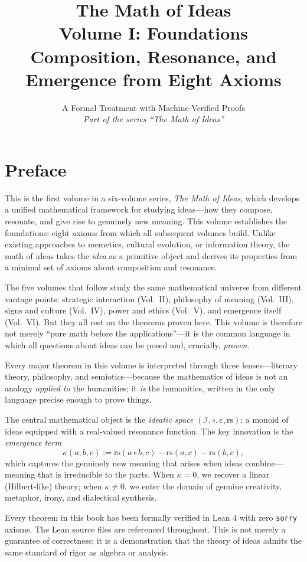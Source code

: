 \documentclass[11pt,oneside]{book}
\title{\Huge\bfseries The Math of Ideas\\[0.3em]
\LARGE Volume I: Foundations\\[0.5em]
\Large Composition, Resonance, and Emergence from Eight Axioms}
\author{A Formal Treatment with Machine-Verified Proofs\\[0.3em]
\normalsize\textit{Part of the series ``The Math of Ideas''}}
\date{}
\theoremstyle{plain}
\theoremstyle{definition}
\theoremstyle{remark}
\newcommand{\rs}{\mathrm{rs}}
\newcommand{\emerge}{\kappa}
\newcommand{\compose}{\circ}
\newcommand{\void}{\varepsilon}
\newcommand{\IS}{\mathcal{I}}
\begin{document}
\maketitle

\frontmatter

\chapter*{Preface}

This is the first volume in a six-volume series, \emph{The Math of Ideas}, which 
develops a unified mathematical framework for studying ideas---how they compose, 
resonate, and give rise to genuinely new meaning. This volume establishes the 
foundations: eight axioms from which all subsequent volumes build. Unlike existing 
approaches to memetics, cultural evolution, or information theory, the math of 
ideas takes the \emph{idea} as a primitive object and derives its properties from 
a minimal set of axioms about composition and resonance.

The five volumes that follow study the same mathematical universe from different 
vantage points: strategic interaction (Vol.~II), philosophy of meaning (Vol.~III), 
signs and culture (Vol.~IV), power and ethics (Vol.~V), and emergence itself 
(Vol.~VI). But they all rest on the theorems proven here. This volume is therefore 
not merely ``pure math before the applications''---it is the common language in 
which all questions about ideas can be posed and, crucially, \emph{proven}.

Every major theorem in this volume is interpreted through three lenses---literary 
theory, philosophy, and semiotics---because the mathematics of ideas is not an 
analogy \emph{applied to} the humanities; it \emph{is} the humanities, written in 
the only language precise enough to prove things.

The central mathematical object is the \emph{ideatic space} $(\IS, \compose, \void, \rs)$:
a monoid of ideas equipped with a real-valued resonance function. The key innovation
is the \emph{emergence term}
\[
\emerge(a,b,c) := \rs(a \compose b, c) - \rs(a,c) - \rs(b,c),
\]
which captures the genuinely new meaning that arises when ideas combine---meaning
that is irreducible to the parts. When $\emerge = 0$, we recover a linear (Hilbert-like)
theory; when $\emerge \neq 0$, we enter the domain of genuine creativity, metaphor,
irony, and dialectical synthesis.

Every theorem in this book has been formally verified in Lean 4 with zero \texttt{sorry}
axioms. The Lean source files are referenced throughout. This is not merely a
guarantee of correctness; it is a demonstration that the theory of ideas admits
the same standard of rigor as algebra or analysis.
\end{document}
